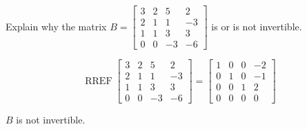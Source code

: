 
\begin{exerciseStatement}


Explain why the matrix \(B= \left[\begin{array}{cccc}
3 & 2 & 5 & 2 \\
2 & 1 & 1 & -3 \\
1 & 1 & 3 & 3 \\
0 & 0 & -3 & -6
\end{array}\right] \) is or is not invertible.


\end{exerciseStatement}
    
\begin{exerciseAnswer} 


\[\operatorname{RREF} \left[\begin{array}{cccc}
3 & 2 & 5 & 2 \\
2 & 1 & 1 & -3 \\
1 & 1 & 3 & 3 \\
0 & 0 & -3 & -6
\end{array}\right] = \left[\begin{array}{cccc}
1 & 0 & 0 & -2 \\
0 & 1 & 0 & -1 \\
0 & 0 & 1 & 2 \\
0 & 0 & 0 & 0
\end{array}\right] \]

\(B\) is not invertible.
\end{exerciseAnswer}
    

